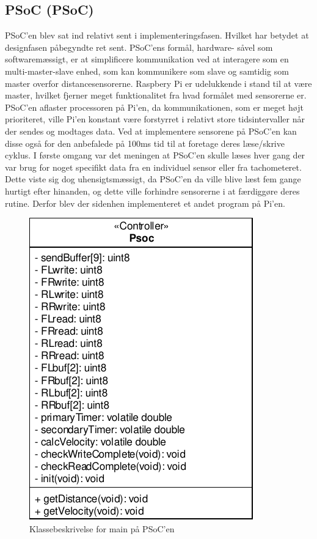 \subsection{PSoC (PSoC)} \label{sec:sw_design_psoc_psoc}

PSoC'en blev sat ind relativt sent i implementeringsfasen. Hvilket har betydet at designfasen påbegyndte ret sent.
PSoC'ens formål, hardware- såvel som softwaremæssigt, er at simplificere \IIC kommunikation ved at interagere som en multi-master-slave enhed, som kan kommunikere som \IIC slave og samtidig som \IIC master overfor distancesensorerne. 
Raspbery Pi er udelukkende i stand til at være master, hvilket fjerner meget funktionalitet fra hvad formålet med sensorerne er. 
PSoC'en aflaster processoren på Pi'en, da \IIC kommunikationen, som er meget højt prioriteret, ville Pi'en konstant være forstyrret i relativt store tidsintervaller når der sendes og modtages data. 
Ved at implementere sensorene på PSoC'en kan disse også for den anbefalede på 100ms tid til at foretage deres læse/skrive cyklus. 
I første omgang var det meningen at PSoC'en skulle læses hver gang der var brug for noget specifikt data fra en individuel sensor eller fra tachometeret. 
Dette viste sig dog uhensigtsmæssigt, da PSoC'en da ville blive læst fem gange hurtigt efter hinanden, og dette ville forhindre sensorerne i at færdiggøre deres rutine. Derfor blev der sidenhen implementeret et andet program på Pi'en. 

\begin{figure}[h]
\centering
\includegraphics[]{../fig/diagrammer/psoc/cd_psoc.pdf}
\caption{Klassebeskrivelse for main på PSoC'en}
\label{fig:cd_main_psoc}
\end{figure}

